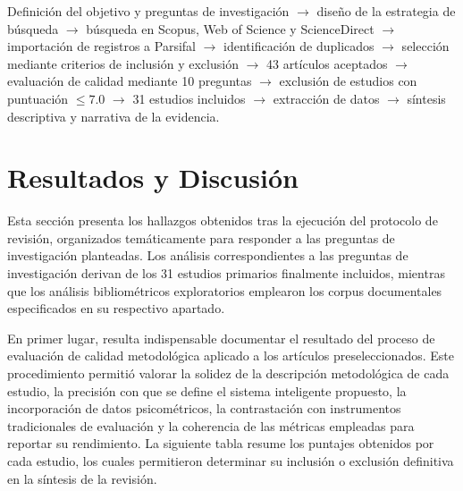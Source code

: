\documentclass{iaesarticle}
\begin{document}
\begin{center}
\begin{minipage}{0.90\textwidth}
\centering
Definición del objetivo y preguntas de investigación
$\rightarrow$
diseño de la estrategia de búsqueda
$\rightarrow$
búsqueda en Scopus, Web of Science y ScienceDirect
$\rightarrow$
importación de registros a Parsifal
$\rightarrow$
identificación de duplicados
$\rightarrow$
selección mediante criterios de inclusión y exclusión
$\rightarrow$
43 artículos aceptados
$\rightarrow$
evaluación de calidad mediante 10 preguntas
$\rightarrow$
exclusión de estudios con puntuación $\leq 7.0$
$\rightarrow$
31 estudios incluidos
$\rightarrow$
extracción de datos
$\rightarrow$
síntesis descriptiva y narrativa de la evidencia.
\end{minipage}
\end{center}












\section{Resultados y Discusión}
\label{sec:resultados}

Esta sección presenta los hallazgos obtenidos tras la ejecución del protocolo de revisión, organizados temáticamente para responder a las preguntas de investigación planteadas. Los análisis correspondientes a las preguntas de investigación derivan de los 31 estudios primarios finalmente incluidos, mientras que los análisis bibliométricos exploratorios emplearon los corpus documentales especificados en su respectivo apartado.

En primer lugar, resulta indispensable documentar el resultado del proceso de evaluación de calidad metodológica aplicado a los artículos preseleccionados. Este procedimiento permitió valorar la solidez de la descripción metodológica de cada estudio, la precisión con que se define el sistema inteligente propuesto, la incorporación de datos psicométricos, la contrastación con instrumentos tradicionales de evaluación y la coherencia de las métricas empleadas para reportar su rendimiento. La siguiente tabla resume los puntajes obtenidos por cada estudio, los cuales permitieron determinar su inclusión o exclusión definitiva en la síntesis de la revisión.
\end{document}
